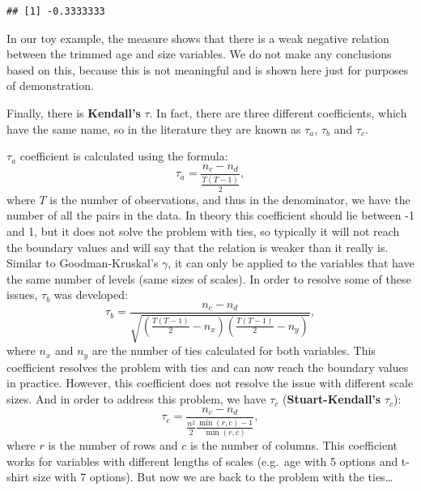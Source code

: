 \documentclass[
]{book}
\theoremstyle{definition}
\theoremstyle{definition}
\theoremstyle{definition}
\theoremstyle{definition}
\theoremstyle{remark}
\begin{document}
\begin{verbatim}
## [1] -0.3333333
\end{verbatim}

In our toy example, the measure shows that there is a weak negative relation between the trimmed age and size variables. We do not make any conclusions based on this, because this is not meaningful and is shown here just for purposes of demonstration.

Finally, there is \textbf{Kendall's} \(\tau\). In fact, there are three different coefficients, which have the same name, so in the literature they are known as \(\tau_a\), \(\tau_b\) and \(\tau_c\).

\(\tau_a\) coefficient is calculated using the formula:
\begin{equation}
    \tau_a = \frac{n_c - n_d}{\frac{T (T-1)}{2}},
    \label{eq:measuresAssociationKendallTaua}
\end{equation}
where \(T\) is the number of observations, and thus in the denominator, we have the number of all the pairs in the data. In theory this coefficient should lie between -1 and 1, but it does not solve the problem with ties, so typically it will not reach the boundary values and will say that the relation is weaker than it really is. Similar to Goodman-Kruskal's \(\gamma\), it can only be applied to the variables that have the same number of levels (same sizes of scales). In order to resolve some of these issues, \(\tau_b\) was developed:
\begin{equation}
    \tau_b = \frac{n_c - n_d}{\sqrt{\left(\frac{T (T-1)}{2} - n_x\right)\left(\frac{T (T-1)}{2} - n_y\right)}},
    \label{eq:measuresAssociationKendallTaub}
\end{equation}
where \(n_x\) and \(n_y\) are the number of ties calculated for both variables. This coefficient resolves the problem with ties and can now reach the boundary values in practice. However, this coefficient does not resolve the issue with different scale sizes. And in order to address this problem, we have \(\tau_c\) (\textbf{Stuart-Kendall's} \(\tau_c\)):
\begin{equation}
    \tau_c = \frac{n_c - n_d}{\frac{n^2}{2}\frac{\min(r, c)-1}{\min(r, c)}},
    \label{eq:measuresAssociationKendallTauc}
\end{equation}
where \(r\) is the number of rows and \(c\) is the number of columns. This coefficient works for variables with different lengths of scales (e.g.~age with 5 options and t-shirt size with 7 options). But now we are back to the problem with the ties\ldots{}
\end{document}

